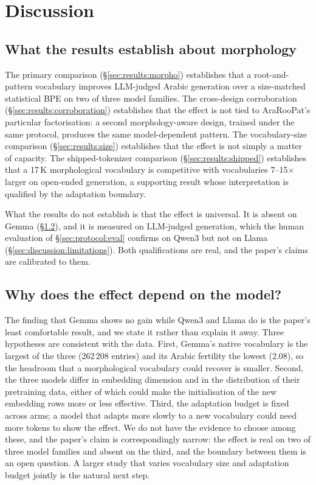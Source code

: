 \documentclass[a4paper,fleqn]{cas-sc}
\begin{document}
\section{Discussion}
\label{sec:discussion}

\subsection{What the results establish about morphology}
\label{sec:discussion:morpho}

The primary comparison (\S\ref{sec:results:morpho}) establishes that a root-and-pattern vocabulary improves LLM-judged Arabic generation over a size-matched statistical BPE on two of three model families. The cross-design corroboration (\S\ref{sec:results:corroboration}) establishes that the effect is not tied to AraRooPat's particular factorisation: a second morphology-aware design, trained under the same protocol, produces the same model-dependent pattern. The vocabulary-size comparison (\S\ref{sec:results:size}) establishes that the effect is not simply a matter of capacity. The shipped-tokenizer comparison (\S\ref{sec:results:shipped}) establishes that a 17\,K morphological vocabulary is competitive with vocabularies 7--15$\times$ larger on open-ended generation, a supporting result whose interpretation is qualified by the adaptation boundary.

What the results do not establish is that the effect is universal. It is absent on Gemma (\S\ref{sec:discussion:model}), and it is measured on LLM-judged generation, which the human evaluation of \S\ref{sec:protocol:eval} confirms on Qwen3 but not on Llama (\S\ref{sec:discussion:limitations}). Both qualifications are real, and the paper's claims are calibrated to them.

\subsection{Why does the effect depend on the model?}
\label{sec:discussion:model}

The finding that Gemma shows no gain while Qwen3 and Llama do is the paper's least comfortable result, and we state it rather than explain it away. Three hypotheses are consistent with the data. First, Gemma's native vocabulary is the largest of the three (262\,208 entries) and its Arabic fertility the lowest (2.08), so the headroom that a morphological vocabulary could recover is smaller. Second, the three models differ in embedding dimension and in the distribution of their pretraining data, either of which could make the initialisation of the new embedding rows more or less effective. Third, the adaptation budget is fixed across arms; a model that adapts more slowly to a new vocabulary could need more tokens to show the effect. We do not have the evidence to choose among these, and the paper's claim is correspondingly narrow: the effect is real on two of three model families and absent on the third, and the boundary between them is an open question. A larger study that varies vocabulary size and adaptation budget jointly is the natural next step.
\end{document}
